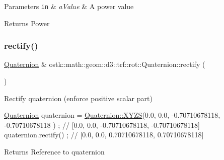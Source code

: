 \begin{DoxyParams}[1]{Parameters}
\mbox{\tt in}  & {\em a\+Value} & A power value \\
\hline
\end{DoxyParams}
\begin{DoxyReturn}{Returns}
Power 
\end{DoxyReturn}
\mbox{\label{classostk_1_1math_1_1geom_1_1d3_1_1trf_1_1rot_1_1_quaternion_a6ff0c86d4e24c7a252dcaf0f5e6c624c}} 
\subsubsection{\texorpdfstring{rectify()}{rectify()}}
{\footnotesize\ttfamily \hyperlink{classostk_1_1math_1_1geom_1_1d3_1_1trf_1_1rot_1_1_quaternion}{Quaternion} \& ostk\+::math\+::geom\+::d3\+::trf\+::rot\+::\+Quaternion\+::rectify (\begin{DoxyParamCaption}{ }\end{DoxyParamCaption})}



Rectify quaternion (enforce positive scalar part) 


\begin{DoxyCode}
\hyperlink{classostk_1_1math_1_1geom_1_1d3_1_1trf_1_1rot_1_1_quaternion_ad9fd7d8eb5effb4d4e0394bbb5bb86dc}{Quaternion} quaternion = \hyperlink{classostk_1_1math_1_1geom_1_1d3_1_1trf_1_1rot_1_1_quaternion_ac57ea57a4033622ed1389101b2e58c76}{Quaternion::XYZS}(0.0, 0.0, -0.70710678118, -0.70710678118
      ) ; \textcolor{comment}{// [0.0, 0.0, -0.70710678118, -0.70710678118]}
quaternion.rectify() ; \textcolor{comment}{// [0.0, 0.0, 0.70710678118, 0.70710678118]}
\end{DoxyCode}


\begin{DoxyReturn}{Returns}
Reference to quaternion 
\end{DoxyReturn}
\mbox{\label{classostk_1_1math_1_1geom_1_1d3_1_1trf_1_1rot_1_1_quaternion_a97cb078bf9b67179cb1553d92617bb99}} 
